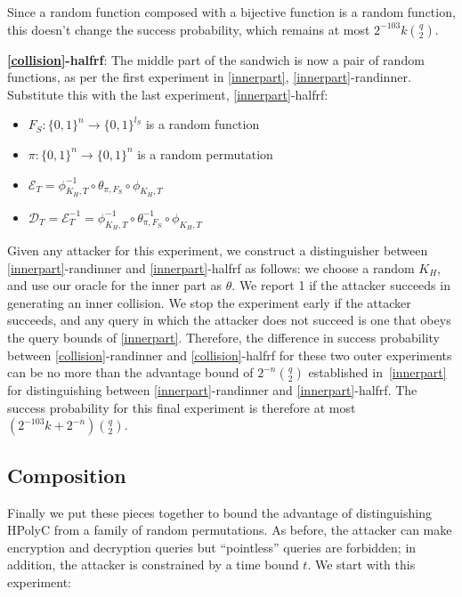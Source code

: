 \documentclass[letterpaper,luatex,11pt]{article}
\newcommand*{\xprm}[2]{\textsf{\ref*{#1}-#2}}
\newcommand*{\xprmtitle}[2]{\textbf{\xprm{#1}{#2}}}
\newcommand*{\calE}{\mathcal{E}}
\newcommand*{\calD}{\mathcal{D}}
\begin{document}
Since a random function composed with a bijective function is a random function,
this doesn't change the success probability, which remains at most
$2^{-103}k\binom{q}{2}$.

\xprmtitle{collision}{halfrf}: The middle part of the sandwich is now a pair of random functions,
as per the first experiment in \autoref{innerpart}, \xprm{innerpart}{randinner}.
Substitute this with the last experiment, \xprm{innerpart}{halfrf}:

\begin{itemize}
    \item $F_S: \{0,1\}^n \rightarrow \{0,1\}^{l_S}$ is a random function
    \item $\pi: \{0,1\}^n \rightarrow \{0,1\}^n$ is a random permutation
    \item $\calE_T = \phi^{-1}_{K_H, T} \circ \theta_{\pi, F_S} \circ \phi_{K_H, T}$
    \item $\calD_T = \calE_T^{-1} = \phi^{-1}_{K_H, T} \circ \theta_{\pi, F_S}^{-1} \circ \phi_{K_H, T}$
\end{itemize}

Given any attacker for this experiment,
we construct a distinguisher between \xprm{innerpart}{randinner} and \xprm{innerpart}{halfrf} as
follows: we choose a random $K_H$, and use our oracle for the inner part as $\theta$.
We report 1 if the attacker succeeds in generating an inner collision.
We stop the experiment early if the attacker succeeds, and any query in which the attacker
does not succeed is one that obeys the query bounds of \autoref{innerpart}.
Therefore, the difference in success probability
between \xprm{collision}{randinner} and \xprm{collision}{halfrf}
for these two outer experiments can be no more than
the advantage bound of $2^{-n}\binom{q}{2}$
established in~\autoref{innerpart} for distinguishing between
\xprm{innerpart}{randinner} and \xprm{innerpart}{halfrf}.
The success
probability for this final experiment is therefore at most
$(2^{-103}k + 2^{-n})\binom{q}{2}$.

\subsection{Composition}\label{composition}

Finally we put these pieces together to bound the advantage of distinguishing HPolyC from
a family of random permutations. As before, the attacker can make encryption and decryption queries
but ``pointless'' queries are forbidden; in addition, the attacker is constrained by a time
bound $t$. We start with this experiment:
\end{document}
